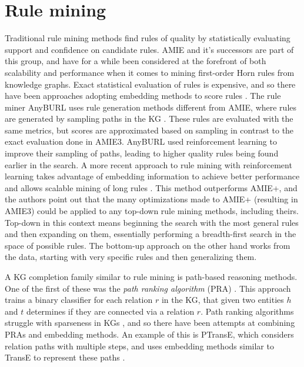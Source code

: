 \section{Rule mining}
Traditional rule mining methods find rules of quality by statistically evaluating support and confidence on candidate rules. AMIE and it's successors are part of this group, and have for a while been considered at the forefront of both scalability and performance when it comes to mining first-order Horn rules from knowledge graphs. Exact statistical evaluation of rules is expensive, and so there have been approaches adopting embedding methods to score rules \cite{yang2014embedding, omran2018scalable, omran2019embedding}. The rule miner AnyBURL uses rule generation methods different from AMIE, where rules are generated by sampling paths in the KG \cite{meilicke2020reinforced}. These rules are evaluated with the same metrics, but scores are approximated based on sampling in contrast to the exact evaluation done in AMIE3. AnyBURL used reinforcement learning to improve their sampling of paths, leading to higher quality rules being found earlier in the search. A more recent approach to rule mining with reinforcement learning takes advantage of embedding information to achieve better performance and allows scalable mining of long rules \cite{chen2022rule}. This method outperforms AMIE+, and the authors point out that the many optimizations made to AMIE+ (resulting in AMIE3) could be applied to any top-down rule mining methods, including theirs. Top-down in this context means beginning the search with the most general rules and then expanding on them, essentially performing a breadth-first search in the space of possible rules. The bottom-up approach on the other hand works from the data, starting with very specific rules and then generalizing them.

A KG completion family similar to rule mining is path-based reasoning methods. One of the first of these was the \textit{path ranking algorithm} (PRA) \cite{lao2011random}. This approach trains a binary classifier for each relation $r$ in the KG, that given two entities $h$ and $t$ determines if they are connected via a relation $r$. Path ranking algorithms struggle with sparseness in KGs \cite{ma2019elpkg}, and so there have been attempts at combining PRAs and embedding methods. An example of this is PTransE, which considers relation paths with multiple steps, and uses embedding methods similar to TransE to represent these paths \cite{lin2015modeling}.  %


